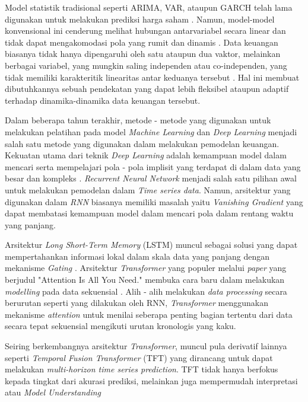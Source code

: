 Model statistik tradisional seperti ARIMA, VAR, ataupun GARCH telah lama digunakan untuk melakukan prediksi harga saham \parencite{NapitupuluWijaya2013}. Namun, model-model konvensional ini cenderung melihat hubungan antarvariabel secara linear dan tidak dapat mengakomodasi pola yang rumit dan dinamis \parencite{Goodfellow-et-al-2016}. Data keuangan biasanya tidak hanya dipengaruhi oleh satu ataupun dua vaktor, melainkan berbagai variabel, yang mungkin saling independen atau co-independen, yang tidak memiliki karakteritik linearitas antar keduanya tersebut \parencite{bhardwaj2022}. Hal ini membuat dibutuhkannya sebuah pendekatan yang dapat lebih fleksibel ataupun adaptif terhadap dinamika-dinamika data keuangan tersebut.

Dalam beberapa tahun terakhir, metode - metode yang digunakan untuk melakukan pelatihan pada model \textit{Machine Learning} dan \textit{Deep Learning} menjadi salah satu metode yang digunakan dalam melakukan pemodelan keuangan. Kekuatan utama dari teknik \textit{Deep Learning} adalah kemampuan model dalam mencari serta mempelajari pola - pola implisit yang terdapat di dalam data yang besar dan kompleks . \textit{Recurrent Neural Network} menjadi salah satu pilihan awal untuk melakukan pemodelan dalam \textit{Time series data}. Namun, arsitektur yang digunakan dalam \textit{RNN} biasanya memiliki masalah yaitu \textit{Vanishing Gradient} \parencite{Hochreiter1997} yang dapat membatasi kemampuan model dalam mencari pola dalam rentang waktu yang panjang.


Arsitektur \textit{Long Short-Term Memory} (LSTM) muncul sebagai solusi yang dapat mempertahankan informasi lokal dalam skala data yang panjang dengan mekanisme \textit{Gating} \parencite{Hochreiter1997}. Arsitektur \textit{Transformer} yang populer melalui \textit{paper} yang berjudul "Attention Is All You Need." membuka cara baru dalam melakukan \textit{modelling} pada data sekuensial \parencite{Vaswani2017}. Alih - alih melakukan \textit{data processing} secara berurutan seperti yang dilakukan oleh RNN, \textit{Transformer} menggunakan mekanisme \textit{attention} untuk menilai seberapa penting bagian tertentu dari data secara tepat sekuensial mengikuti urutan kronologis yang kaku. 

Seiring berkembangnya arsitektur \textit{Transformer}, muncul pula derivatif lainnya seperti  \textit{Temporal Fusion Transformer} (TFT) yang dirancang untuk dapat melakukan \textit{multi-horizon time series prediction}. TFT tidak hanya berfokus kepada tingkat dari akurasi prediksi, melainkan juga mempermudah interpretasi atau \textit{Model Understanding} \parencite{Lim2020}


